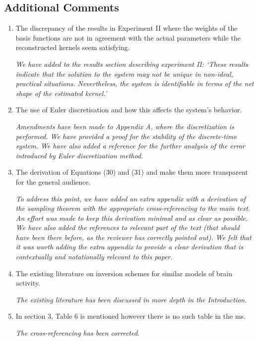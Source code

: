 \documentclass{article}
\begin{document}
    \subsection{Additional Comments}
    
    \begin{enumerate}
        \item The discrepancy of the results in Experiment II where the weights of the basis functions are not in agreement with the actual parameters while the reconstructed kernels seem satisfying.

		\emph{We have added to the results section describing experiment II: `These results indicate that the solution to the system may not be unique in non-ideal, practical situations. Nevertheless, the system is identifiable in terms of the net shape of the estimated kernel.'}

        \item The use of Euler discretisation and how this affects the system's behavior.

		\emph{Amendments have been made to Appendix A, where the discretization is performed. We have provided a proof for the stability of the discrete-time system. We have also added a reference for the further analysis of the error introduced by Euler discretization method.}
		
        \item The derivation of Equations (30) and (31) and make them more transparent for the general audience.

\emph{To address this point, we have added an extra appendix with a derivation of the sampling theorem with the appropriate cross-referencing to the main text. An effort was made to keep this derivation minimal and as clear as possible. We have also added the references to relevant part of the text (that should have been there before, as the reviewer has correctly pointed out). We felt that it was worth adding the extra appendix to provide a clear derivation that is contextually and notationally relevant to this paper.}

        \item The existing literature on inversion schemes for similar models of brain activity.

\emph{The existing literature has been discussed in more depth in the Introduction.}

        \item In section 3, Table 6 is mentioned however there is no such table in the ms.

\emph{The cross-referencing has been corrected.}

    \end{enumerate}
    
\end{document}
